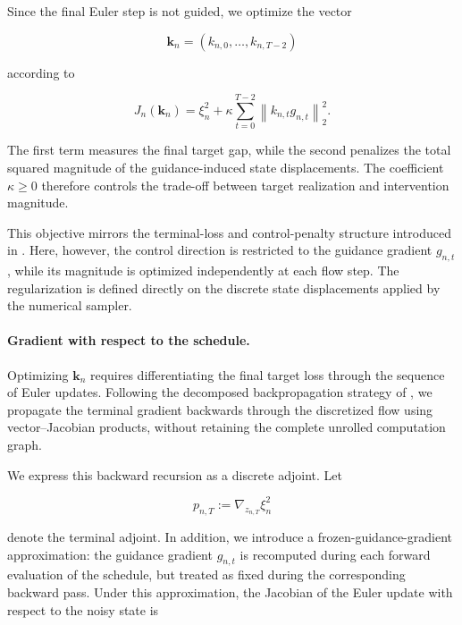 Since the final Euler step is not guided, we optimize the vector

\begin{equation}
    \mathbf{k}_n
    =
    \left(
        k_{n,0},\ldots,k_{n,T-2}
    \right)
\end{equation}

according to

\begin{equation}
    J_n(\mathbf{k}_n)
    =
    \xi_n^2
    +
    \kappa
    \sum_{t=0}^{T-2}
    \left\|
        k_{n,t}g_{n,t}
    \right\|_2^2.
    \label{eq:optimize-schedule-objective}
\end{equation}

The first term measures the final target gap, while the second penalizes the
total squared magnitude of the guidance-induced state displacements.
The coefficient $\kappa\geq0$ therefore controls the trade-off between target
realization and intervention magnitude.

This objective mirrors the terminal-loss and control-penalty structure
introduced in . Here, however, the control
direction is restricted to the guidance gradient $g_{n,t}$, while its magnitude
is optimized independently at each flow step. The regularization is defined
directly on the discrete state displacements applied by the numerical sampler.

\paragraph{Gradient with respect to the schedule.}

Optimizing $\mathbf{k}_n$ requires differentiating the final target loss
through the sequence of Euler updates. Following the decomposed
backpropagation strategy of \textcite{liu2023flowgrad}, we propagate the
terminal gradient backwards through the discretized flow using
vector--Jacobian products, without retaining the complete unrolled
computation graph.

We express this backward recursion as a discrete adjoint. Let

\begin{equation}
    p_{n,T}
    :=
    \nabla_{z_{n,T}}\xi_n^2
\end{equation}

denote the terminal adjoint. In addition, we introduce a
frozen-guidance-gradient approximation: the guidance gradient $g_{n,t}$ is
recomputed during each forward evaluation of the schedule, but treated as
fixed during the corresponding backward pass. Under this approximation, the
Jacobian of the Euler update with respect to the noisy state is


